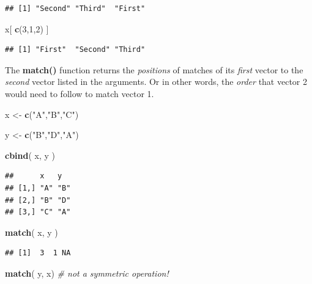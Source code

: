 \documentclass[]{book}
\newenvironment{Shaded}{\begin{snugshade}}{\end{snugshade}}
\newcommand{\CommentTok}[1]{\textcolor[rgb]{0.56,0.35,0.01}{\textit{#1}}}
\newcommand{\DecValTok}[1]{\textcolor[rgb]{0.00,0.00,0.81}{#1}}
\newcommand{\KeywordTok}[1]{\textcolor[rgb]{0.13,0.29,0.53}{\textbf{#1}}}
\newcommand{\NormalTok}[1]{#1}
\newcommand{\StringTok}[1]{\textcolor[rgb]{0.31,0.60,0.02}{#1}}
\theoremstyle{definition}
\theoremstyle{definition}
\theoremstyle{definition}
\theoremstyle{remark}
\begin{document}
\begin{verbatim}
## [1] "Second" "Third"  "First"
\end{verbatim}

\begin{Shaded}
\begin{Highlighting}[]
\NormalTok{x[ }\KeywordTok{c}\NormalTok{(}\DecValTok{3}\NormalTok{,}\DecValTok{1}\NormalTok{,}\DecValTok{2}\NormalTok{) ]}
\end{Highlighting}
\end{Shaded}

\begin{verbatim}
## [1] "First"  "Second" "Third"
\end{verbatim}

The \textbf{match()} function returns the \emph{positions} of matches of
its \emph{first} vector to the \emph{second} vector listed in the
arguments. Or in other words, the \emph{order} that vector 2 would need
to follow to match vector 1.

\begin{Shaded}
\begin{Highlighting}[]
\NormalTok{x <-}\StringTok{ }\KeywordTok{c}\NormalTok{(}\StringTok{"A"}\NormalTok{,}\StringTok{"B"}\NormalTok{,}\StringTok{"C"}\NormalTok{)}

\NormalTok{y <-}\StringTok{ }\KeywordTok{c}\NormalTok{(}\StringTok{"B"}\NormalTok{,}\StringTok{"D"}\NormalTok{,}\StringTok{"A"}\NormalTok{)}

\KeywordTok{cbind}\NormalTok{( x, y )}
\end{Highlighting}
\end{Shaded}

\begin{verbatim}
##      x   y  
## [1,] "A" "B"
## [2,] "B" "D"
## [3,] "C" "A"
\end{verbatim}

\begin{Shaded}
\begin{Highlighting}[]
\KeywordTok{match}\NormalTok{( x, y )}
\end{Highlighting}
\end{Shaded}

\begin{verbatim}
## [1]  3  1 NA
\end{verbatim}

\begin{Shaded}
\begin{Highlighting}[]
\KeywordTok{match}\NormalTok{( y, x) }\CommentTok{# not a symmetric operation!}
\end{Highlighting}
\end{Shaded}
\end{document}
